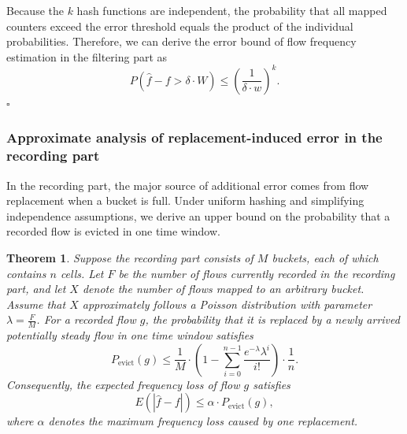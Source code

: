 \documentclass[preprint,12pt]{elsarticle}
\newtheorem{theorem}{Theorem}
\begin{document}
Because the $k$ hash functions are independent, the probability that all mapped counters exceed the error threshold equals the product of the individual probabilities. Therefore, we can derive the error bound of flow frequency estimation in the filtering part as
\begin{equation}
    P(\hat{f} - f > \delta \cdot W) \le \left(\frac{1}{\delta \cdot w}\right)^k.
\end{equation}
\hfill $\square$

\subsubsection{Approximate analysis of replacement-induced error in the recording part}

In the recording part, the major source of additional error comes from flow replacement when a bucket is full. Under uniform hashing and simplifying independence assumptions, we derive an upper bound on the probability that a recorded flow is evicted in one time window.

\begin{theorem}
Suppose the recording part consists of $M$ buckets, each of which contains $n$ cells. Let $F$ be the number of flows currently recorded in the recording part, and let $X$ denote the number of flows mapped to an arbitrary bucket. Assume that $X$ approximately follows a Poisson distribution with parameter $\lambda = \frac{F}{M}$. For a recorded flow $g$, the probability that it is replaced by a newly arrived potentially steady flow in one time window satisfies
\begin{equation}
    P_{\text{evict}}(g) \le \frac{1}{M} \cdot \left(1 - \sum_{i=0}^{n-1}\frac{e^{-\lambda}\lambda^i}{i!}\right) \cdot \frac{1}{n}.
\end{equation}
Consequently, the expected frequency loss of flow $g$ satisfies
\begin{equation}
    E\left(|\hat{f} - f|\right) \le \alpha \cdot P_{\text{evict}}(g),
\end{equation}
where $\alpha$ denotes the maximum frequency loss caused by one replacement.
\end{theorem}
\end{document}

